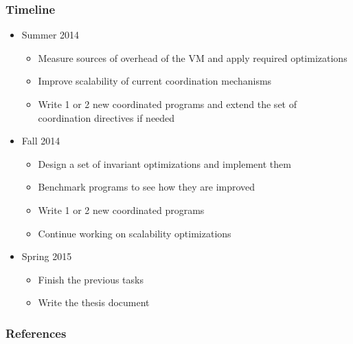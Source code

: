 \documentclass{beamer}
\begin{document}
\begin{frame}[fragile]
   \frametitle{Timeline}
   \begin{itemize}
      \item Summer 2014
      \begin{itemize}
         \item Measure sources of overhead of the VM and apply required optimizations
         \item Improve scalability of current coordination mechanisms
         \item Write 1 or 2 new coordinated programs and extend the set of coordination directives if needed
      \end{itemize}
      \item Fall 2014
      \begin{itemize}
         \item Design a set of invariant optimizations and implement them
         \item Benchmark programs to see how they are improved
         \item Write 1 or 2 new coordinated programs
         \item Continue working on scalability optimizations
      \end{itemize}
      \item Spring 2015
      \begin{itemize}
         \item Finish the previous tasks
         \item Write the thesis document
      \end{itemize}
   \end{itemize}
\end{frame}

\begin{frame}[allowframebreaks]
  \frametitle{References}
  
  
\end{frame}
\end{document}
